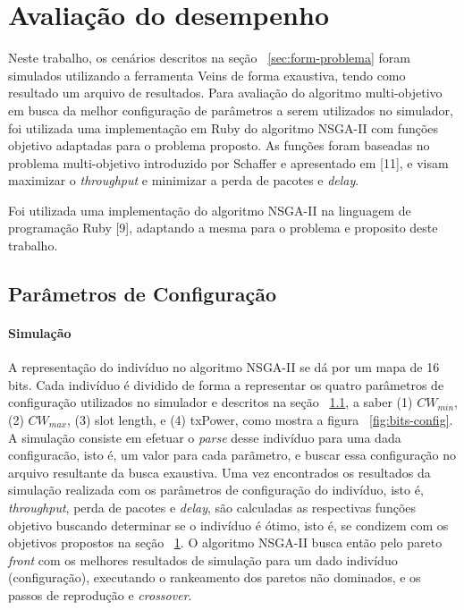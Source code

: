 \documentclass[conference]{IEEEtran}
\begin{document}
\section{Avaliação do desempenho}
\label{sec:avaliacao-desemp}

Neste trabalho, os cenários descritos na seção ~\ref{sec:form-problema} foram simulados utilizando a ferramenta Veins  de forma exaustiva, tendo como resultado um arquivo de resultados. Para avaliação do algoritmo multi-objetivo em busca da melhor configuração de parâmetros a serem utilizados no simulador, foi utilizada uma implementação em Ruby do algoritmo NSGA-II com funções objetivo adaptadas para o problema proposto. As funções foram baseadas no problema multi-objetivo introduzido por Schaffer e apresentado em [11], e visam maximizar o \textit{throughput} e minimizar a perda de pacotes e \textit{delay}.

Foi utilizada uma implementação do algoritmo NSGA-II na linguagem de programação Ruby [9], adaptando a mesma para o problema e proposito deste trabalho.

\subsection{Parâmetros de Configuração}
\label{subsec:param-config}


\paragraph{Simulação}

A representação do indivíduo no algoritmo NSGA-II se dá por um mapa de
16 bits.  Cada indivíduo é dividido de forma a representar os quatro
parâmetros de configuração utilizados no simulador e descritos na
seção ~\ref{subsec:param-config}, a saber (1) $CW_{min}$, (2)
$CW_{max}$, (3) slot length, e (4) txPower, como mostra a figura
~\ref{fig:bits-config}.  A simulação consiste em efetuar o
\textit{parse} desse indivíduo para uma dada configuracão, isto é, um
valor para cada parãmetro, e buscar essa configuração no arquivo
resultante da busca exaustiva. Uma vez encontrados os resultados da
simulação realizada com os parâmetros de configuração do indivíduo,
isto é, \textit{throughput}, perda de pacotes e \textit{delay}, são calculadas as respectivas funções objetivo buscando determinar se o indivíduo é ótimo, isto é, se condizem com os objetivos propostos na
seção ~\ref{sec:avaliacao-desemp}.
O algoritmo NSGA-II busca então pelo pareto \textit{front} com os melhores resultados de simulação para um dado indivíduo (configuração), executando o rankeamento dos paretos não dominados, e os passos de reprodução e \textit{crossover}.
\end{document}
